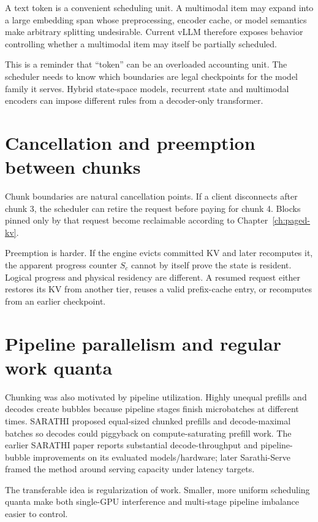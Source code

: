 A text token is a convenient scheduling unit. A multimodal item may expand into a
large embedding span whose preprocessing, encoder cache, or model semantics make
arbitrary splitting undesirable. Current vLLM therefore exposes behavior controlling
whether a multimodal item may itself be partially scheduled.

This is a reminder that ``token'' can be an overloaded accounting unit. The scheduler
needs to know which boundaries are legal checkpoints for the model family it serves.
Hybrid state-space models, recurrent state and multimodal encoders can impose
different rules from a decoder-only transformer.

\section{Cancellation and preemption between chunks}

Chunk boundaries are natural cancellation points. If a client disconnects after
chunk 3, the scheduler can retire the request before paying for chunk 4. Blocks pinned
only by that request become reclaimable according to Chapter~\ref{ch:paged-kv}.

Preemption is harder. If the engine evicts committed KV and later recomputes it, the
apparent progress counter $S_c$ cannot by itself prove the state is resident. Logical
progress and physical residency are different. A resumed request either restores its
KV from another tier, reuses a valid prefix-cache entry, or recomputes from an earlier
checkpoint.

\section{Pipeline parallelism and regular work quanta}

Chunking was also motivated by pipeline utilization. Highly unequal prefills and
decodes create bubbles because pipeline stages finish microbatches at different times.
SARATHI proposed equal-sized chunked prefills and decode-maximal batches so decodes
could piggyback on compute-saturating prefill work. The earlier SARATHI paper reports
substantial decode-throughput and pipeline-bubble improvements on its evaluated
models/hardware; later Sarathi-Serve framed the method around serving capacity under
latency targets.

The transferable idea is regularization of work. Smaller, more uniform scheduling
quanta make both single-GPU interference and multi-stage pipeline imbalance easier to
control.


